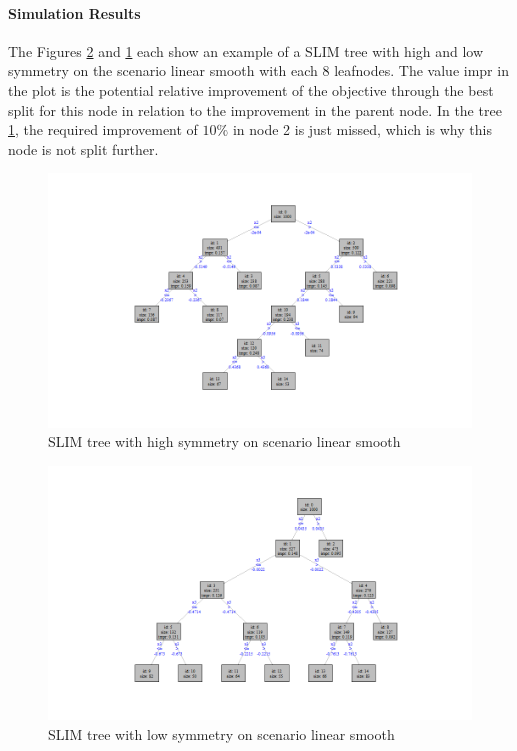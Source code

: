 \paragraph{Simulation Results}
The Figures \ref{fig:app_tree_low_symmetry} and \ref{fig:app_tree_high_symmetry} each show an example of a SLIM tree with high and low symmetry on the scenario linear smooth with each 8 leafnodes. The value impr in the plot is the potential relative improvement of the objective through the best split for this node in relation to the improvement in the parent node. In the tree \ref{fig:app_tree_high_symmetry}, the required improvement of $10 \%$ in node 2 is just missed, which is why this node is not split further.
\begin{figure}[!htb]
    \centering    
    \includegraphics[width = 16cm]{Figures/simulations/chapter_5_simulation_study/basic_scenarios/linear_smooth/tree_high_symmetry.png}  
    \caption{SLIM tree with high symmetry on scenario linear smooth}
    \label{fig:app_tree_high_symmetry}
\end{figure}

\begin{figure}[!htb]
    \includegraphics[width = 16cm]{Figures/simulations/chapter_5_simulation_study/basic_scenarios/linear_smooth/tree_low_symmetry.png}
    \caption{SLIM tree with low symmetry on scenario linear smooth}
    \label{fig:app_tree_low_symmetry}
\end{figure}




